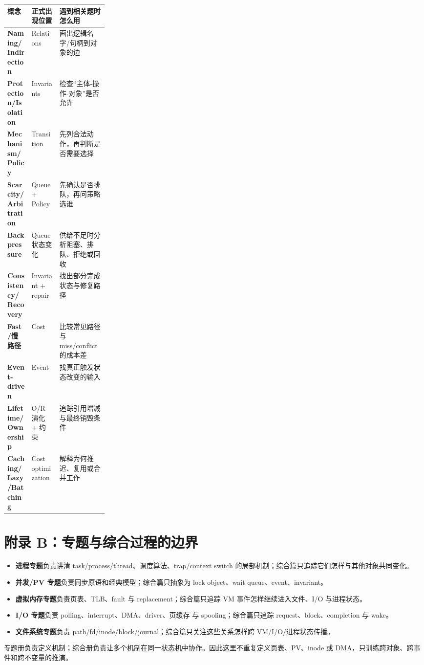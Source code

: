 \documentclass[11pt,a4paper]{ctexart}
\newcommand{\kw}[1]{\textbf{#1}}
\begin{document}
\begin{center}
\small
\renewcommand{\arraystretch}{1.25}
\begin{tabularx}{\linewidth}{>{\bfseries}p{0.24\linewidth} X X}
\toprule
概念 & 正式出现位置 & 遇到相关题时怎么用 \\
\midrule
Naming/Indirection & Relations & 画出逻辑名字/句柄到对象的边 \\
Protection/Isolation & Invariants & 检查“主体-操作-对象”是否允许 \\
Mechanism/Policy & Transition & 先列合法动作，再判断是否需要选择 \\
Scarcity/Arbitration & Queue + Policy & 先确认是否排队，再问策略选谁 \\
Backpressure & Queue 状态变化 & 供给不足时分析阻塞、排队、拒绝或回收 \\
Consistency/Recovery & Invariant + repair & 找出部分完成状态与修复路径 \\
Fast/慢路径 & Cost & 比较常见路径与 miss/conflict 的成本差 \\
Event-driven & Event & 找真正触发状态改变的输入 \\
Lifetime/Ownership & O/R 演化 + 约束 & 追踪引用增减与最终销毁条件 \\
Caching/Lazy/Batching & Cost optimization & 解释为何推迟、复用或合并工作 \\
\bottomrule
\end{tabularx}
\end{center}

\section{附录 B：专题与综合过程的边界}

\begin{itemize}
  \item \kw{进程专题}负责讲清 task/process/thread、调度算法、trap/context switch 的局部机制；综合篇只追踪它们怎样与其他对象共同变化。
  \item \kw{并发/PV 专题}负责同步原语和经典模型；综合篇只抽象为 lock object、wait queue、event、invariant。
  \item \kw{虚拟内存专题}负责页表、TLB、fault 与 replacement；综合篇只追踪 VM 事件怎样继续进入文件、I/O 与进程状态。
  \item \kw{I/O 专题}负责 polling、interrupt、DMA、driver、页缓存 与 spooling；综合篇只追踪 request、block、completion 与 wake。
  \item \kw{文件系统专题}负责 path/fd/inode/block/journal；综合篇只关注这些关系怎样跨 VM/I/O/进程状态传播。
\end{itemize}

\begin{method}[使用边界]
专题册负责定义机制；综合册负责让多个机制在同一状态机中协作。因此这里不重复定义页表、PV、inode 或 DMA，只训练跨对象、跨事件和跨不变量的推演。
\end{method}
\end{document}
